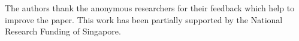 The authors thank the anonymous researchers for their feedback which help to improve the paper. This work has been partially supported by the National Research Funding of Singapore. 